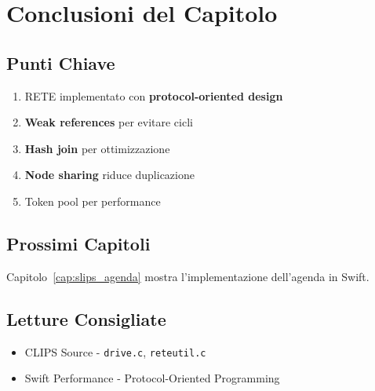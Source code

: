 \section{Conclusioni del Capitolo}

\subsection{Punti Chiave}

\begin{enumerate}
\item RETE implementato con \textbf{protocol-oriented design}
\item \textbf{Weak references} per evitare cicli
\item \textbf{Hash join} per ottimizzazione
\item \textbf{Node sharing} riduce duplicazione
\item Token pool per performance
\end{enumerate}

\subsection{Prossimi Capitoli}

Capitolo~\ref{cap:slips_agenda} mostra l'implementazione dell'agenda in Swift.

\subsection{Letture Consigliate}

\begin{itemize}
\item CLIPS Source - \texttt{drive.c}, \texttt{reteutil.c}
\item Swift Performance - Protocol-Oriented Programming
\end{itemize}
